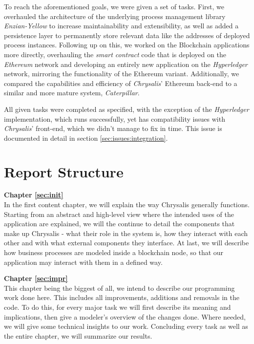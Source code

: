 To reach the aforementioned goals, we were given a set of tasks. First, we overhauled the architecture of the underlying process management library \emph{Enzian-Yellow} to increase maintainability and extensibility, as well as added a persistence layer to permanently store relevant data like the addresses of deployed process instances. Following up on this, we worked on the Blockchain applications more directly, overhauling the \emph{smart contract} code that is deployed on the \emph{Ethereum} network and developing an entirely new application on the \emph{Hyperledger} network, mirroring the functionality of the Ethereum variant. Additionally, we compared the capabilities and efficiency of \emph{Chrysalis}' Ethereum back-end to a similar and more mature system, \emph{Caterpillar}.

All given tasks were completed as specified, with the exception of the \emph{Hyperledger} implementation, which runs successfully, yet has compatibility issues with \emph{Chrysalis}' front-end, which we didn't manage to fix in time. This issue is documented in detail in section \ref{sec:issues:integration}.

\section{Report Structure}
\label{sec:intro:structure}

\textbf{Chapter \ref{sec:init}} \\[0.2em]
In the first content chapter, we will explain the way Chrysalis generally functions. Starting from an abstract and high-level view where the intended uses of the application are explained, we will the continue to detail the components that make up Chrysalis - what their role in the system is, how they interact with each other and with what external components they interface. At last, we will describe how business processes are modeled inside a blockchain node, so that our application may interact with them in a defined way.

\textbf{Chapter \ref{sec:impr}} \\[0.2em]
This chapter being the biggest of all, we intend to describe our programming work done here. This includes all improvements, additions and removals in the code. To do this, for every major task we will first describe its meaning and implications, then give a modeler's overview of the changes done. Where needed, we will give some technical insights to our work. Concluding every task as well as the entire chapter, we will summarize our results.

